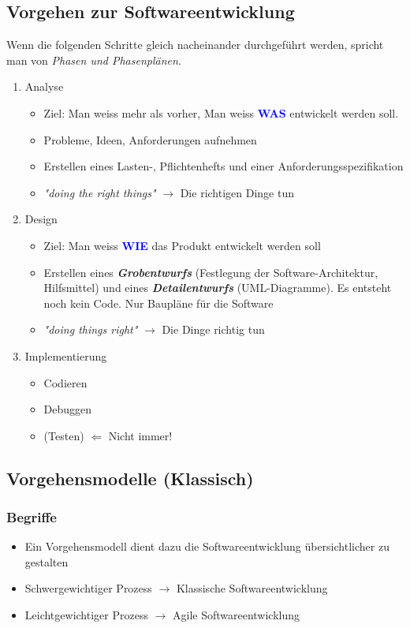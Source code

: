 \subsection{Vorgehen zur Softwareentwicklung}
Wenn die folgenden Schritte gleich nacheinander durchgeführt werden, spricht man von \textit{Phasen und Phasenplänen}.
	\begin{enumerate}
		\item Analyse
			\begin{itemize}
				\item Ziel: Man weiss mehr als vorher, Man weiss \textbf{\textcolor{blue}{WAS}} entwickelt werden soll.
				\item Probleme, Ideen, Anforderungen aufnehmen
				\item Erstellen eines Lasten-, Pflichtenhefts und einer Anforderungsspezifikation
				\item \textit{"doing the right things"} $\rightarrow$ Die richtigen Dinge tun
			\end{itemize}
		\item Design
			\begin{itemize}
				\item Ziel: Man weiss \textbf{\textcolor{blue}{WIE}} das Produkt entwickelt werden soll
				\item Erstellen eines \textbf{\textit{Grobentwurfs}} (Festlegung der Software-Architektur, Hilfsmittel) und \newline eines \textbf{\textit{Detailentwurfs}} (UML-Diagramme). Es entsteht noch kein Code. Nur Baupläne für die Software
				\item \textit{"doing things right"} $\rightarrow$ Die Dinge richtig tun
			\end{itemize}
		\item Implementierung
			\begin{itemize}
				\item Codieren
				\item Debuggen
				\item (Testen) $\Leftarrow$ Nicht immer!
			\end{itemize}
	\end{enumerate}

\subsection{Vorgehensmodelle (Klassisch)}
\subsubsection{Begriffe}
\begin{itemize}
	\item Ein Vorgehensmodell dient dazu die Softwareentwicklung übersichtlicher zu gestalten
	\item Schwergewichtiger Prozess $\rightarrow$ Klassische Softwareentwicklung
	\item Leichtgewichtiger Prozess $\rightarrow$ Agile Softwareentwicklung
\end{itemize}

